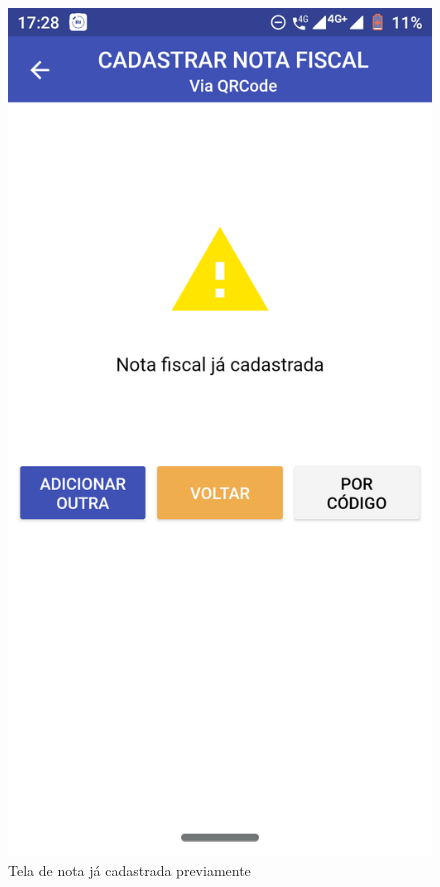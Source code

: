\begin{figure}[h]
    \centering
    \includegraphics[scale=0.15]{tcc/figures/app/app_codigo_qrcode_ja_cadastrada.png}
    \caption{Tela de nota já cadastrada previamente}
    \label{appQRCodeJaCadastradaFig}
\end{figure}

